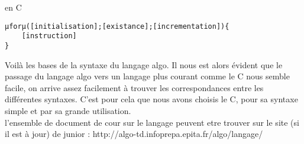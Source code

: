en C
\begin{lstlisting}[style=base]
µforµ([initialisation];[existance];[incrementation]){
	[instruction]
}
\end{lstlisting}


Voilà les bases de la syntaxe du langage algo. Il nous est alors évident que le
passage du langage algo vers un langage plus courant comme le C nous semble
facile, on arrive assez facilement à trouver les correspondances entre les
différentes syntaxes. C'est pour cela que nous avons choisis le C, pour sa
syntaxe simple et par sa grande utilisation.
\\

l'ensemble de document de cour sur le langage peuvent etre trouver sur le
site (si il est à jour) de junior : 
http://algo-td.infoprepa.epita.fr/algo/langage/
